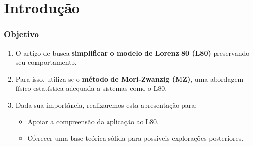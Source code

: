 \section{Introdução} %


\begin{frame}\frametitle{Objetivo}
	\begin{enumerate}
		\item O artigo de \cite{Chekroun2021} busca \textbf{simplificar o modelo de Lorenz 80 (L80)} preservando seu comportamento.
		              
		\item Para isso, utiliza-se o \textbf{método de Mori-Zwanzig (MZ)}, uma abordagem físico-estatística adequada a sistemas como o L80.
		              
		\item Dada sua importância, realizaremos esta apresentação para:
		      \begin{itemize}
		      	\item Apoiar a compreensão da aplicação ao L80.
		      	\item Oferecer uma base teórica sólida para possíveis explorações posteriores.
		      \end{itemize}
	\end{enumerate}
\end{frame}


